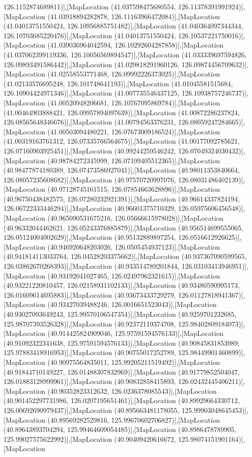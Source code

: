 126.1152874689811)],[MapLocation (41.037598475680554, 126.11378391991924)],[MapLocation (41.03918894282878, 126.11163966472084)],[MapLocation (41.04013751550424, 126.10956885751482)],[MapLocation (41.040364097344344, 126.10703685220476)],[MapLocation (41.04013751550424, 126.10537221750016)],[MapLocation (41.039036964042594, 126.10292604287858)],[MapLocation (41.037062399119336, 126.10056569894547)],[MapLocation (41.033339697594826, 126.09893491586442)],[MapLocation (41.029818291960126, 126.09874456709632)],[MapLocation (41.02558553771468, 126.09992226373025)],[MapLocation (41.02133576695248, 126.101748641193)],[MapLocation (41.01045581515684, 126.10904424971346)],[MapLocation (41.007735546437125, 126.10938757246737)],[MapLocation (41.00520948206681, 126.10767095869784)],[MapLocation (41.00464903888421, 126.09957894097639)],[MapLocation (41.00872286237824, 126.08565648346676)],[MapLocation (41.00794563376231, 126.08059247284665)],[MapLocation (41.00503094480221, 126.07673009186524)],[MapLocation (41.00319163761312, 126.07335766564675)],[MapLocation (41.00177092785621, 126.07160903925451)],[MapLocation (40.99244259546242, 126.07049324030432)],[MapLocation (40.98784272345999, 126.07109405512365)],[MapLocation (40.98477874180389, 126.07473586927041)],[MapLocation (40.98011353840664, 126.08057235608682)],[MapLocation (40.97570720997076, 126.08031486402139)],[MapLocation (40.97128745161515, 126.07854663628896)],[MapLocation (40.96750438482575, 126.07280232921391)],[MapLocation (40.96614337824194, 126.06722333446294)],[MapLocation (40.96601375710329, 126.05975606456548)],[MapLocation (40.965090531675216, 126.05666615978028)],[MapLocation (40.96332044462621, 126.05243376885879)],[MapLocation (40.956514699555065, 126.05124004002629)],[MapLocation (40.95132889897254, 126.0516612926625)],[MapLocation (40.946920648203026, 126.0505454937123)],[MapLocation (40.941814113033764, 126.04528203375662)],[MapLocation (40.937367090599565, 126.03862670268393)],[MapLocation (40.933514789201844, 126.03103413946951)],[MapLocation (40.93192041027465, 126.02497962321615)],[MapLocation (40.93221220810457, 126.02158931102133)],[MapLocation (40.93480590995173, 126.01609614695883)],[MapLocation (40.93673433729279, 126.01127818941367)],[MapLocation (40.93427039488246, 126.0016651523043)],[MapLocation (40.93027093649243, 125.99570106547354)],[MapLocation (40.9259701232685, 125.98707393526328)],[MapLocation (40.92372119374708, 125.98402809184073)],[MapLocation (40.914425824909046, 125.97591594576133)],[MapLocation (40.91092322341638, 125.97591594576133)],[MapLocation (40.90845831853989, 125.97883418916953)],[MapLocation (40.90755017252789, 125.98449901460899)],[MapLocation (40.90975564835011, 125.99205211519492)],[MapLocation (40.91844710149227, 126.01488307832969)],[MapLocation (40.91779852504047, 126.01883128999961)],[MapLocation (40.90832858415893, 126.02432445406211)],[MapLocation (40.90352823312632, 126.0236378085543)],[MapLocation (40.901452297731986, 126.0207195651461)],[MapLocation (40.89929664330712, 126.00692690979437)],[MapLocation (40.895663481178055, 125.99903048645453)],[MapLocation (40.89569282529816, 125.99670602706827)],[MapLocation (40.89643893704294, 125.99464609054485)],[MapLocation (40.8986478789905, 125.99027575622992)],[MapLocation (40.90409420616672, 125.98074151901164)],[MapLocation 